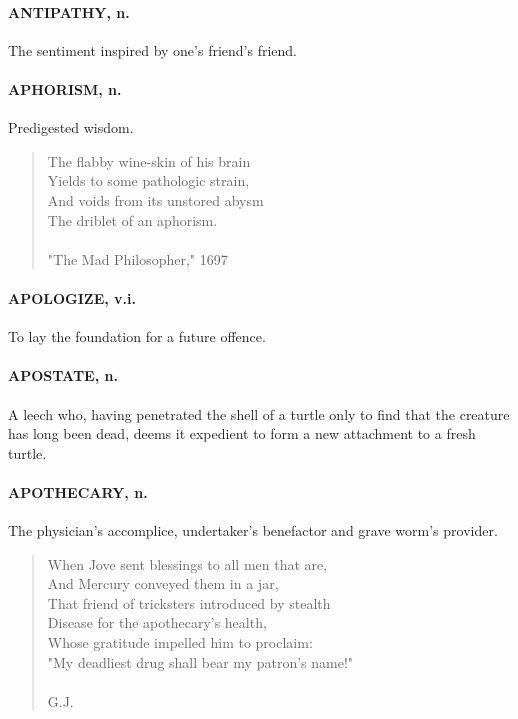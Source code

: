 \documentclass[11pt]{article}
\begin{document}
\paragraph{ANTIPATHY, n.}  The sentiment inspired by one's friend's friend.

\paragraph{APHORISM, n.}  Predigested wisdom.

\begin{quote}   The flabby wine-skin of his brain \\
  Yields to some pathologic strain, \\
  And voids from its unstored abysm \\
  The driblet of an aphorism. \\
 \\
"The Mad Philosopher," 1697 \end{quote}


\paragraph{APOLOGIZE, v.i.}  To lay the foundation for a future offence.

\paragraph{APOSTATE, n.}  A leech who, having penetrated the shell of a turtle
only to find that the creature has long been dead, deems it expedient
to form a new attachment to a fresh turtle.

\paragraph{APOTHECARY, n.}  The physician's accomplice, undertaker's benefactor
and grave worm's provider.

\begin{quote}   When Jove sent blessings to all men that are, \\
  And Mercury conveyed them in a jar, \\
  That friend of tricksters introduced by stealth \\
  Disease for the apothecary's health, \\
  Whose gratitude impelled him to proclaim: \\
  "My deadliest drug shall bear my patron's name!" \\
 \\
G.J. \end{quote}
\end{document}
